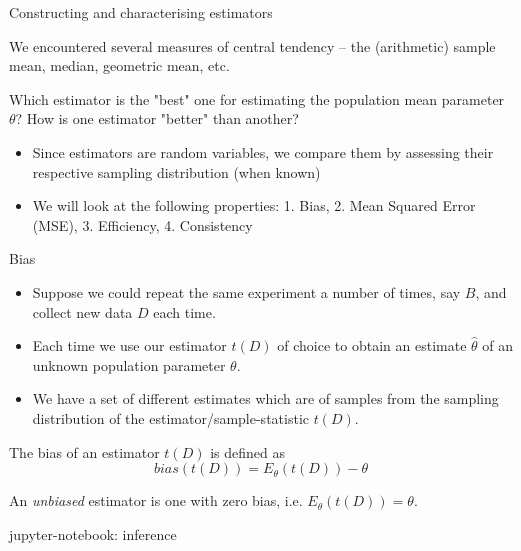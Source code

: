 \documentclass{beamer}
\begin{document}
\begin{frame}{Constructing and characterising estimators}

	We encountered several measures of central tendency – the (arithmetic) sample mean, median, geometric mean, etc.

	\begin{block}{}
	Which estimator is the "best" one for estimating the population mean parameter $\theta$? 
	How is one estimator "better" than another?
	\end{block}

	\pause

	\begin{itemize}
		\item Since estimators are random variables, we compare them by assessing their
		respective sampling distribution (when known)
		\item We will look at the following properties: 1. Bias, 2. Mean Squared
		Error (MSE), 3. Efficiency, 4. Consistency
	\end{itemize}

\end{frame}

\begin{frame}{Bias}

	\begin{itemize}
		\item Suppose we could repeat the same experiment a number of times, say $B$, and collect new data $D$ each time.
		\item Each time we use our estimator $t(D)$ of choice to obtain an estimate $\hat{\theta}$ of an unknown 
	population parameter $\theta$.
		\item We have a set of different estimates which are of samples from the sampling distribution of the
	estimator/sample-statistic $t(D)$.
	\end{itemize}

	\pause
	
	The bias of an estimator $t(D)$ is defined as
	\begin{equation*}
		bias(t(D)) = E_\theta(t(D)) - \theta
	\end{equation*}

	An \textit{unbiased} estimator is one with zero bias, i.e. $E_\theta(t(D)) = \theta$.

	\tiny
	jupyter-notebook: inference

\end{frame}
\end{document}

